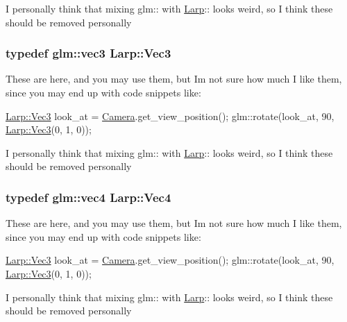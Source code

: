 I personally think that mixing glm\+:\+: with \hyperlink{namespaceLarp}{Larp}\+:\+: looks weird, so I think these should be removed personally 
\subsubsection[{\texorpdfstring{Vec3}{Vec3}}]{\setlength{\rightskip}{0pt plus 5cm}typedef glm\+::vec3 {\bf Larp\+::\+Vec3}}\hypertarget{namespaceLarp_a477b379311661e072acd751be3d473aa}{}\label{namespaceLarp_a477b379311661e072acd751be3d473aa}
These are here, and you may use them, but I\textquotesingle{}m not sure how much I like them, since you may end up with code snippets like\+:


\begin{DoxyCode}
\hyperlink{namespaceLarp_a477b379311661e072acd751be3d473aa}{Larp::Vec3} look\_at = \hyperlink{classCamera}{Camera}.get\_view\_position();
glm::rotate(look\_at, 90, \hyperlink{namespaceLarp_a477b379311661e072acd751be3d473aa}{Larp::Vec3}(0, 1, 0));
\end{DoxyCode}


I personally think that mixing glm\+:\+: with \hyperlink{namespaceLarp}{Larp}\+:\+: looks weird, so I think these should be removed personally 
\subsubsection[{\texorpdfstring{Vec4}{Vec4}}]{\setlength{\rightskip}{0pt plus 5cm}typedef glm\+::vec4 {\bf Larp\+::\+Vec4}}\hypertarget{namespaceLarp_a516c3e9937a8bc59ccc93698bad0dc2c}{}\label{namespaceLarp_a516c3e9937a8bc59ccc93698bad0dc2c}
These are here, and you may use them, but I\textquotesingle{}m not sure how much I like them, since you may end up with code snippets like\+:


\begin{DoxyCode}
\hyperlink{namespaceLarp_a477b379311661e072acd751be3d473aa}{Larp::Vec3} look\_at = \hyperlink{classCamera}{Camera}.get\_view\_position();
glm::rotate(look\_at, 90, \hyperlink{namespaceLarp_a477b379311661e072acd751be3d473aa}{Larp::Vec3}(0, 1, 0));
\end{DoxyCode}


I personally think that mixing glm\+:\+: with \hyperlink{namespaceLarp}{Larp}\+:\+: looks weird, so I think these should be removed personally 